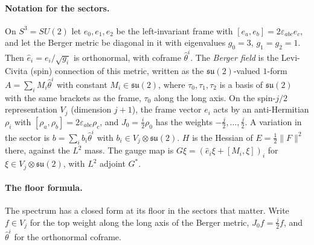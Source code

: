 \documentclass[11pt]{article}
\theoremstyle{definition}
\theoremstyle{remark}
\newcommand{\norm}[1]{\lVert #1\rVert}
\begin{document}
\paragraph{Notation for the sectors.} On $S^3=SU(2)$ let $e_0,e_1,e_2$ be the left-invariant frame
with $[e_a,e_b]=2\varepsilon_{abc}e_c$, and let the Berger metric be diagonal in it with eigenvalues
$g_0=3$, $g_1=g_2=1$. Then $\hat e_i=e_i/\sqrt{g_i}$ is orthonormal, with coframe $\hat\theta^i$. The
\emph{Berger field} is the Levi-Civita (spin) connection of this metric, written as the
$\mathfrak{su}(2)$-valued $1$-form $A=\sum_iM_i\hat\theta^i$ with constant $M_i\in\mathfrak{su}(2)$,
where $\tau_0,\tau_1,\tau_2$ is a basis of $\mathfrak{su}(2)$ with the same brackets as the frame,
$\tau_0$ along the long axis. On
the spin-$j/2$ representation $V_j$ (dimension $j+1$), the frame vector $e_i$ acts by an
anti-Hermitian $\rho_i$ with $[\rho_a,\rho_b]=2\varepsilon_{abc}\rho_c$, and $J_0=\tfrac i2\rho_0$ has the
weights $-\tfrac j2,\dots,\tfrac j2$. A variation in the sector is $b=\sum_ib_i\hat\theta^i$ with
$b_i\in V_j\otimes\mathfrak{su}(2)$. $H$ is the Hessian of $E=\tfrac12\norm{F}^2$ there, against the $L^2$
mass. The gauge map is $G\xi=(\hat e_i\xi+[M_i,\xi])_i$ for $\xi\in V_j\otimes\mathfrak{su}(2)$, with
$L^2$ adjoint $G^*$.

\paragraph{The floor formula.} The spectrum has a closed form at its floor in the sectors that matter. Write $f\in V_j$ for the top
weight along the long axis of the Berger metric, $J_0f=\tfrac j2f$, and $\hat\theta^i$ for the
orthonormal coframe.
\end{document}
